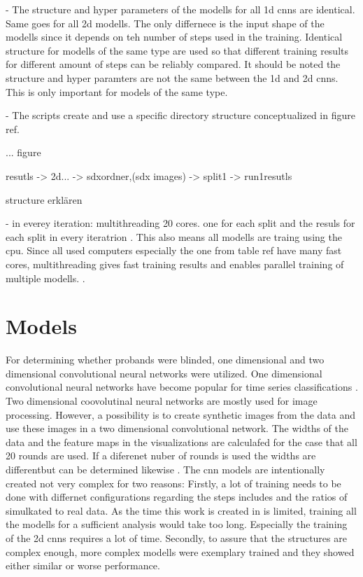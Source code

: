 - The structure and hyper parameters of the modells for all 1d cnns are identical. Same goes for all 2d modells. The only differnece is the input shape of the modells since it depends on teh number of steps used in the training. Identical structure for modells of the same type are used so that different training results for different amount of steps can be reliably compared. It should be noted the structure and hyper paramters are not the same between the 1d and 2d cnns. This is only important for models of the same type. 



- The scripts create and use a specific directory structure conceptualized in figure ref.

... figure 

resutls -> 2d... -> sdxordner,(sdx images) -> split1 -> run1resutls 


structure erklären

- in everey iteration: multithreading 20 cores. one for each split and the resuls for each split in every iteratrion . This also means all modells are traing using the cpu. Since all used computers especially the one from table ref have many fast cores, multithreading gives fast training results and enables parallel training of multiple modells.  .   

\section{Models}
For determining whether probands were blinded, one dimensional and two dimensional convolutional neural networks were utilized. One dimensional convolutional neural networks have become popular for time series classifications . Two dimensional coovolutinal neural networks are mostly used for image processing. However, a possibility is to create synthetic images from the data and use these images in a two dimensional convolutional network. The widths of the data and the feature maps in the visualizations are calculafed for the case that all 20 rounds are used. If a diferenet nuber of rounds is used the widths are differentbut can be determined likewise . The cnn models are intentionally created not very complex for two reasons: Firstly, a lot of training needs to be done with differnet configurations regarding the steps includes and the ratios of simulkated to real data. As the time this work is created in is limited, training all the modells for a sufficient analysis would take too long. Especially the training of the 2d cnns requires a lot of time. Secondly, to assure that the structures are complex enough, more complex modells were exemplary trained and they showed either similar or worse performance.

